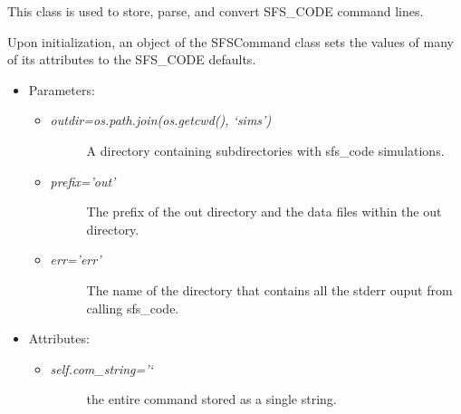 \documentclass[letterpaper,10pt,english]{sphinxmanual}
\begin{document}

\begin{fulllineitems}
\label{index:command.SFSCommand}
This class is used to store, parse, and convert SFS\_CODE command lines.

Upon initialization, an object of the SFSCommand class sets the values
of many of its attributes to the SFS\_CODE defaults.
\begin{itemize}
\item {} 
Parameters:
\begin{itemize}
\item {} \begin{description}
\item[{\emph{outdir=os.path.join(os.getcwd(), `sims')} }] \leavevmode
A directory containing
subdirectories with sfs\_code simulations.

\end{description}

\item {} \begin{description}
\item[{\emph{prefix='out'} }] \leavevmode
The prefix of the out directory and the data files 
within the out directory.

\end{description}

\item {} \begin{description}
\item[{\emph{err='err'}}] \leavevmode
The name of the directory that contains all the stderr ouput from
calling sfs\_code.

\end{description}

\end{itemize}

\item {} 
Attributes:
\begin{itemize}
\item {} \begin{description}
\item[{\emph{self.com\_string='`}}] \leavevmode
the entire command stored as a single string.

\end{description}


\end{itemize}
\end{itemize}
\end{fulllineitems}
\end{document}
